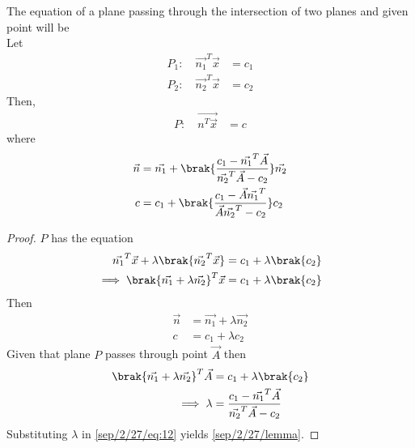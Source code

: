 \begin{lemma}
The equation of a plane passing through the intersection of two planes and given point will be\\
Let 
\begin{align}
P_1: \quad \vec{n_{1}}^T\vec{x}&=c_{1}\\ P_2: \quad  \vec{n_{2}}^T\vec{x}&=c_{2}
\end{align}
Then, 
\begin{align}
P: \quad \vec{n^T\vec{x}}&=c
\end{align}
where
\begin{align}
\label{sep/2/27/lemma}
\vec{n} &= \vec{n_{1}} + \brak{\frac{c_{1} - \vec{n_{1}}^T\vec{A}}{\vec{n_{2}}^T\vec{A}- c_{2}}}\vec{n_{2}}\\
c &= c_{1} + \brak{\frac{c_{1} - \vec{A}\vec{n_{1}}^T}{\vec{A}\vec{n_{2}}^T- c_{2}}}c_{2}
\end{align}
\end{lemma}
\begin{proof}
$P$ has the equation
\begin{align}
\vec{n_{1}}^T\vec{x} + \lambda\brak{\vec{n_{2}}^T\vec{x}} = c_{1} + \lambda\brak{c_{2}}\\
\implies \brak{\vec{n_{1}}+\lambda\vec{n_{2}}}^T\vec{x} = c_{1} + \lambda\brak{c_{2}}
\end{align}
Then
\begin{align}\label{sep/2/27/eq:12}
\vec{n} &= \vec{n_{1}} + \lambda\vec{n_{2}}\\
c &= c_{1} + \lambda c_{2}
\end{align}
Given that plane $P$ passes through point $\vec{A}$ then
\begin{align}
\brak{\vec{n_{1}}+\lambda\vec{n_{2}}}^T\vec{A} &= c_{1} + \lambda\brak{c_{2}}\\
\implies \lambda &= \frac{c_{1} - \vec{n_{1}}^T\vec{A}}{\vec{n_{2}}^T\vec{A}- c_{2}}
\end{align}
Substituting $\lambda$ in \eqref{sep/2/27/eq:12} yields \ref{sep/2/27/lemma}.
 \end{proof}
